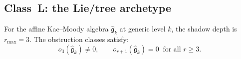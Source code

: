
\subsection{Class~L: the Lie/tree archetype}
\label{subsec:class-l-lie-tree}

\begin{theorem}[$r_{\max}(\widehat{\mathfrak{g}}_k) = 3$;
\ClaimStatusProvedHere]
\label{thm:lie-rmax-three}
For the affine Kac--Moody algebra
$\widehat{\mathfrak{g}}_k$ at generic level $k$, the
shadow depth is $r_{\max} = 3$. The obstruction classes
satisfy:
\begin{equation}\label{eq:lie-obstruction-pattern}
o_3(\widehat{\mathfrak{g}}_k) \neq 0,
\qquad
o_{r+1}(\widehat{\mathfrak{g}}_k) = 0
\;\;\text{for all } r \geq 3.
\end{equation}
\end{theorem}

